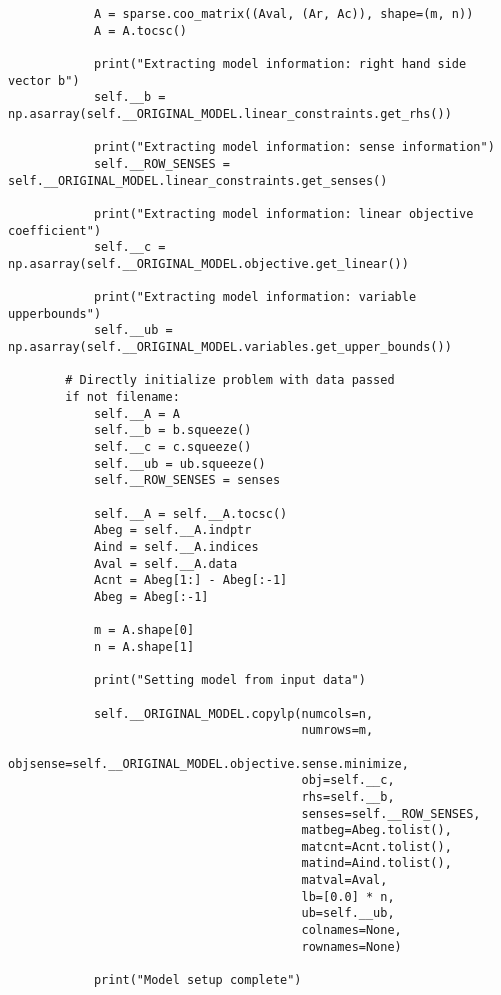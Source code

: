 \documentclass{article}
\begin{document}
\begin{lstlisting}
            A = sparse.coo_matrix((Aval, (Ar, Ac)), shape=(m, n))
            A = A.tocsc()

            print("Extracting model information: right hand side vector b")
            self.__b = np.asarray(self.__ORIGINAL_MODEL.linear_constraints.get_rhs())

            print("Extracting model information: sense information")
            self.__ROW_SENSES = self.__ORIGINAL_MODEL.linear_constraints.get_senses()

            print("Extracting model information: linear objective coefficient")
            self.__c = np.asarray(self.__ORIGINAL_MODEL.objective.get_linear())

            print("Extracting model information: variable upperbounds")
            self.__ub = np.asarray(self.__ORIGINAL_MODEL.variables.get_upper_bounds())

        # Directly initialize problem with data passed
        if not filename:
            self.__A = A
            self.__b = b.squeeze()
            self.__c = c.squeeze()
            self.__ub = ub.squeeze()
            self.__ROW_SENSES = senses

            self.__A = self.__A.tocsc()
            Abeg = self.__A.indptr
            Aind = self.__A.indices
            Aval = self.__A.data
            Acnt = Abeg[1:] - Abeg[:-1]
            Abeg = Abeg[:-1]

            m = A.shape[0]
            n = A.shape[1]

            print("Setting model from input data")

            self.__ORIGINAL_MODEL.copylp(numcols=n,
                                         numrows=m,
                                         objsense=self.__ORIGINAL_MODEL.objective.sense.minimize,
                                         obj=self.__c,
                                         rhs=self.__b,
                                         senses=self.__ROW_SENSES,
                                         matbeg=Abeg.tolist(),
                                         matcnt=Acnt.tolist(),
                                         matind=Aind.tolist(),
                                         matval=Aval,
                                         lb=[0.0] * n,
                                         ub=self.__ub,
                                         colnames=None,
                                         rownames=None)

            print("Model setup complete")


\end{lstlisting}
\end{document}

